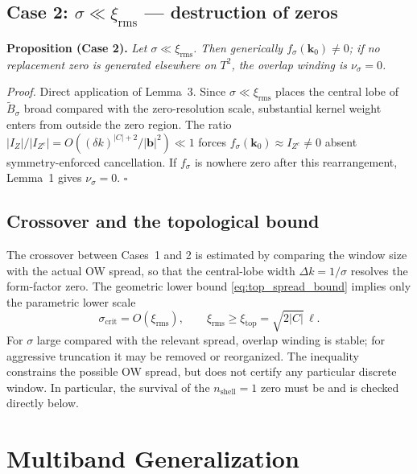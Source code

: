 \documentclass[aps,prb,onecolumn,nofootinbib,superscriptaddress]{revtex4-2}
\newcommand{\mbf}[1]{\mathbf{#1}}
\begin{document}
\subsection{Case 2: \texorpdfstring{$\sigma \ll \xi_{\mathrm{rms}}$}{sigma much less than xi-rms} --- destruction of zeros}

\noindent\textbf{Proposition (Case 2).} \emph{Let $\sigma \ll \xi_{\mathrm{rms}}$. Then generically $f_\sigma(\mbf{k}_0) \neq 0$; if no replacement zero is generated elsewhere on $T^2$, the overlap winding is $\nu_\sigma=0$.}

\medskip
\noindent\emph{Proof.} Direct application of Lemma~3. Since $\sigma \ll \xi_{\mathrm{rms}}$ places the central lobe of $\widetilde{B}_\sigma$ broad compared with the zero-resolution scale, substantial kernel weight enters from outside the zero region. The ratio $|I_Z|/|I_{Z^c}| = O((\delta k)^{|C|+2}/|\mbf{b}|^2) \ll 1$ forces $f_\sigma(\mbf{k}_0) \approx I_{Z^c} \neq 0$ absent symmetry-enforced cancellation. If $f_\sigma$ is nowhere zero after this rearrangement, Lemma~1 gives $\nu_\sigma=0$. $\square$

\subsection{Crossover and the topological bound}

The crossover between Cases~1 and 2 is estimated by comparing the window size with the actual OW spread, so that the central-lobe width $\Delta k=1/\sigma$ resolves the form-factor zero.  The geometric lower bound \eqref{eq:top_spread_bound} implies only the parametric lower scale
\begin{equation}
\boxed{\sigma_{\mathrm{crit}}=O(\xi_{\mathrm{rms}}),
\qquad
\xi_{\mathrm{rms}}\geq\xi_{\mathrm{top}}=\sqrt{2|C|}\,\ell.}
\end{equation}
For $\sigma$ large compared with the relevant spread, overlap winding is stable; for aggressive truncation it may be removed or reorganized.  The inequality constrains the possible OW spread, but does not certify any particular discrete window.  In particular, the survival of the $n_{\mathrm{shell}}=1$ zero must be and is checked directly below.

\section{Multiband Generalization}
\label{sec:multiband}
\end{document}
